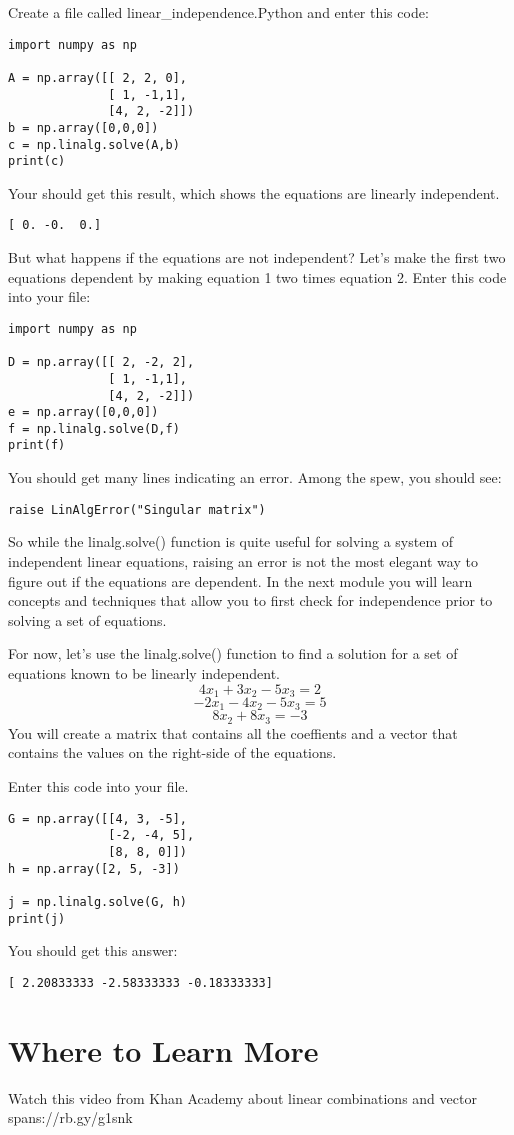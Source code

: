 Create a file called linear\_independence.Python and enter this code:
\begin{Verbatim}
import numpy as np

A = np.array([[ 2, 2, 0], 
              [ 1, -1,1],
              [4, 2, -2]])
b = np.array([0,0,0])
c = np.linalg.solve(A,b)
print(c)
\end{Verbatim}
Your should get this result, which shows the equations are linearly independent.
\begin{Verbatim}
[ 0. -0.  0.]
\end{Verbatim}
But what happens if the equations are not independent? Let's make the first two equations dependent by making equation 1 two times equation 2. Enter this code into your file:
\begin{Verbatim}
import numpy as np

D = np.array([[ 2, -2, 2], 
              [ 1, -1,1],
              [4, 2, -2]])
e = np.array([0,0,0])
f = np.linalg.solve(D,f)
print(f)
\end{Verbatim}
You should get many lines indicating an error. Among the spew, you should see:
\begin{Verbatim}
raise LinAlgError("Singular matrix")
\end{Verbatim}
So while the linalg.solve() function is quite useful for solving a system of independent linear equations, raising an error is not the most elegant way to figure out if the equations are dependent. In the next module you will learn concepts and techniques that allow you to first check for independence prior to solving a set of equations. 

For now, let's use the  linalg.solve() function to find a solution for a set of equations known to be linearly independent.
$$4x_1 + 3x_2 - 5x_3 = 2$$
$$-2x_1- 4x_2 - 5x_3 = 5$$
$$       8x_2 + 8x_3  = -3$$
You will create a matrix that contains all the coeffients and a vector that contains the values on the right-side of the equations. 

Enter this code into your file. 
\begin{Verbatim}
G = np.array([[4, 3, -5], 
              [-2, -4, 5], 
              [8, 8, 0]])
h = np.array([2, 5, -3])

j = np.linalg.solve(G, h)
print(j)
\end{Verbatim}
You should get this answer:
\begin{Verbatim}
[ 2.20833333 -2.58333333 -0.18333333]
\end{Verbatim}

\section{Where to Learn More}
Watch this video from Khan Academy about linear combinations and vector spans://rb.gy/g1snk